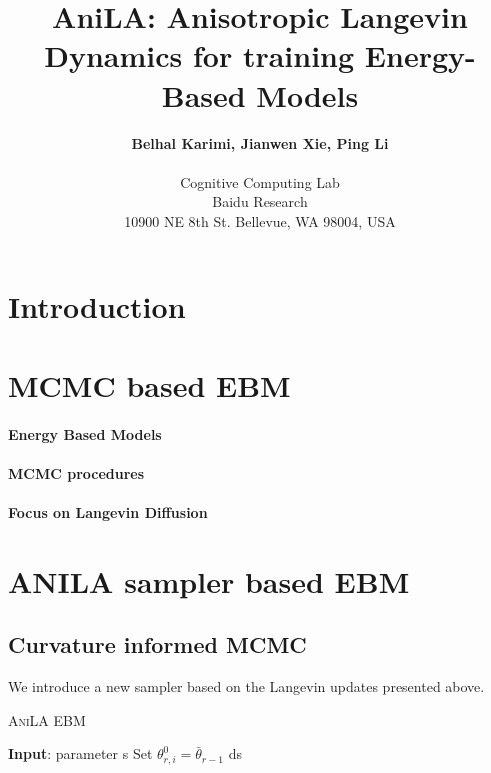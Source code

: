 \documentclass{article}
\begin{document}
\title{AniLA: Anisotropic Langevin Dynamics for training Energy-Based Models}

 \author{\textbf{Belhal Karimi, Jianwen Xie, Ping Li} \\\\
 Cognitive Computing Lab\\
 Baidu Research\\
   10900 NE 8th St. Bellevue, WA 98004, USA
 }

\date{}
\maketitle

\begin{abstract}
\end{abstract}

\section{Introduction}

\section{MCMC based EBM}

\paragraph{Energy Based Models}

\paragraph{MCMC procedures}

\paragraph{Focus on Langevin Diffusion}

\section{ANILA sampler based EBM}

\subsection{Curvature informed MCMC}

We introduce a new sampler based on the Langevin updates presented above.

\begin{algorithm}[H]
\caption{\textsc{AniLA EBM}} \label{alg:ldams}
\begin{algorithmic}[1]
\STATE \textbf{Input}: parameter s
\STATE Set $\theta_{r,i}^{0} = \bar{\theta}_{r-1}$
\ENDFOR
\STATE ds
\end{algorithmic}
\end{algorithm}
\end{document}
